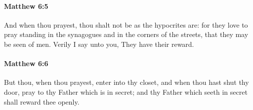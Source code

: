 		\paragraph{Matthew 6:5} %
			\label{MATTHEW-6-5}

			And when thou prayest, thou shalt not be as the hypocrites are: for they love to pray standing in the synagogues and in the corners of the streets, that they may be seen of men. Verily I say unto you, They have their reward.

			\begin{framed}
			\scriptsize
				\begin{compactdesc}
					\item[SBLG] 
				\end{compactdesc}
			\end{framed}

		\paragraph{Matthew 6:6} %
			\label{MATTHEW-6-6}

			But thou, when thou prayest, enter into thy closet, and when thou hast shut thy door, pray to thy Father which is in secret; and thy Father which seeth in secret shall reward thee openly.


